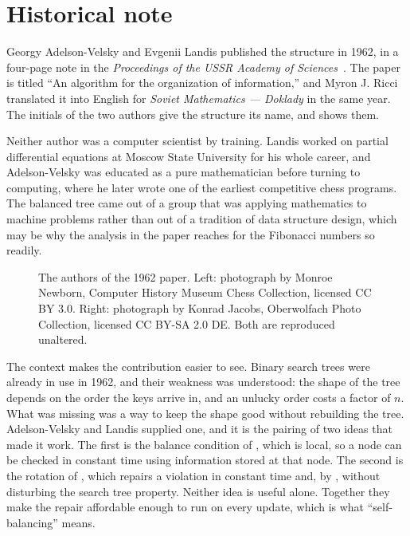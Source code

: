 \section{Historical note}
\label{sec:history}

Georgy Adelson-Velsky and Evgenii Landis published the structure in 1962, in a
four-page note in the \emph{Proceedings of the USSR Academy of
Sciences}~\cite{avl1962}. The paper is titled ``An algorithm for the organization
of information,'' and Myron J. Ricci translated it into English for
\emph{Soviet Mathematics --- Doklady} in the same year. The initials of the two
authors give the structure its name, and  shows them.

Neither author was a computer scientist by training. Landis worked on partial
differential equations at Moscow State University for his whole career, and
Adelson-Velsky was educated as a pure mathematician before turning to computing,
where he later wrote one of the earliest competitive chess programs. The balanced
tree came out of a group that was applying mathematics to machine problems rather
than out of a tradition of data structure design, which may be why the analysis
in the paper reaches for the Fibonacci numbers so readily.

\begin{figure}[t]
  \centering
  
  \caption{The authors of the 1962 paper. Left: photograph by Monroe Newborn,
  Computer History Museum Chess Collection, licensed CC BY 3.0. Right:
  photograph by Konrad Jacobs, Oberwolfach Photo Collection, licensed
  CC BY-SA 2.0 DE. Both are reproduced unaltered.}
  \label{fig:portraits}
\end{figure}

The context makes the contribution easier to see. Binary search trees were
already in use in 1962, and their weakness was understood: the shape of the tree
depends on the order the keys arrive in, and an unlucky order costs a factor of
$n$. What was missing was a way to keep the shape good without rebuilding the
tree. Adelson-Velsky and Landis supplied one, and it is the pairing of two ideas
that made it work. The first is the balance condition of , which is
local, so a node can be checked in constant time using information stored at that
node. The second is the rotation of , which repairs a
violation in constant time and, by , without disturbing the
search tree property. Neither idea is useful alone. Together they make the repair
affordable enough to run on every update, which is what ``self-balancing'' means.

